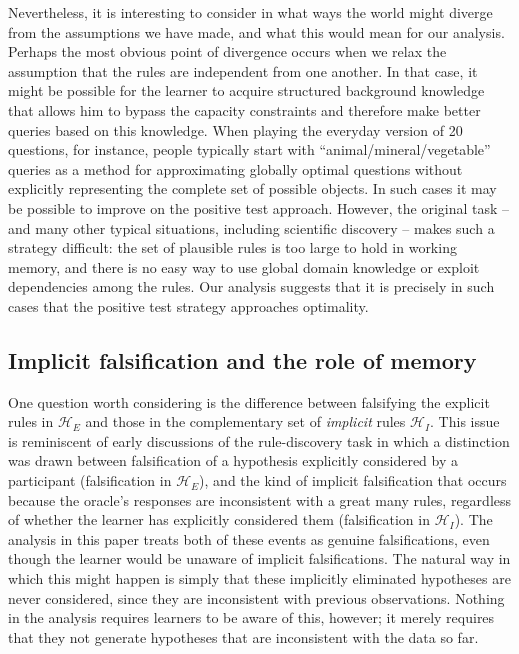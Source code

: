 \documentclass{apa}
\newcommand{\ruleset}{\mathcal{H}}
\begin{document}
Nevertheless, it is interesting to consider in what ways the world might diverge from the assumptions we have made, and what this would mean for our analysis. Perhaps the most obvious point of divergence occurs when we relax the assumption that the rules are independent from one another.  In that case, it might be possible for the learner to acquire structured background knowledge that allows him to bypass the capacity constraints and therefore make better queries based on this knowledge.  When playing the everyday version of 20 questions, for instance, people typically start with ``animal/mineral/vegetable'' queries as a method for approximating globally optimal questions without explicitly representing the complete set of possible objects. In such cases it may be possible to improve on the positive test approach.  However, the original  task -- and many other typical situations, including scientific discovery -- makes such a strategy difficult: the set of plausible rules is too large to hold in working memory, and there is no easy way to use global domain knowledge or exploit dependencies among the rules. Our analysis suggests that it is precisely in such cases that the positive test strategy approaches optimality.

\subsection{Implicit falsification and the role of memory}

One question worth considering is the difference between falsifying the explicit rules in $\ruleset_E$ and those in the complementary set of {\it implicit} rules $\ruleset_I$. This issue is reminiscent of early discussions of the rule-discovery task \cite{Wetherick1962,Wason1962} in which a distinction was drawn between falsification of a hypothesis explicitly considered by a participant (falsification in $\ruleset_E$), and the kind of implicit falsification that occurs because the oracle's responses are inconsistent with a great many rules, regardless of whether the learner has explicitly considered them (falsification in $\ruleset_I$). The analysis in this paper treats both of these events as genuine falsifications, even though the learner would be unaware of implicit falsifications. The natural way in which this might happen is simply that these implicitly eliminated hypotheses are never considered, since they are inconsistent with previous observations. Nothing in the analysis requires learners to be aware of this, however; it merely requires that they not generate hypotheses that are inconsistent with the data so far.
\end{document}
